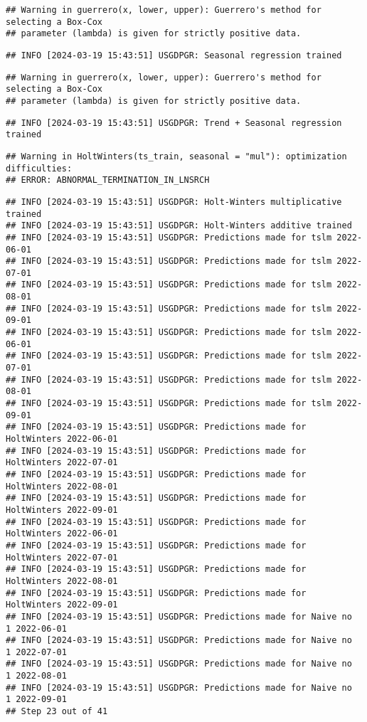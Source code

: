 \documentclass[
]{article}
\begin{document}
\begin{verbatim}
## Warning in guerrero(x, lower, upper): Guerrero's method for selecting a Box-Cox
## parameter (lambda) is given for strictly positive data.
\end{verbatim}

\begin{verbatim}
## INFO [2024-03-19 15:43:51] USGDPGR: Seasonal regression trained
\end{verbatim}

\begin{verbatim}
## Warning in guerrero(x, lower, upper): Guerrero's method for selecting a Box-Cox
## parameter (lambda) is given for strictly positive data.
\end{verbatim}

\begin{verbatim}
## INFO [2024-03-19 15:43:51] USGDPGR: Trend + Seasonal regression trained
\end{verbatim}

\begin{verbatim}
## Warning in HoltWinters(ts_train, seasonal = "mul"): optimization difficulties:
## ERROR: ABNORMAL_TERMINATION_IN_LNSRCH
\end{verbatim}

\begin{verbatim}
## INFO [2024-03-19 15:43:51] USGDPGR: Holt-Winters multiplicative trained
## INFO [2024-03-19 15:43:51] USGDPGR: Holt-Winters additive trained
## INFO [2024-03-19 15:43:51] USGDPGR: Predictions made for tslm 2022-06-01
## INFO [2024-03-19 15:43:51] USGDPGR: Predictions made for tslm 2022-07-01
## INFO [2024-03-19 15:43:51] USGDPGR: Predictions made for tslm 2022-08-01
## INFO [2024-03-19 15:43:51] USGDPGR: Predictions made for tslm 2022-09-01
## INFO [2024-03-19 15:43:51] USGDPGR: Predictions made for tslm 2022-06-01
## INFO [2024-03-19 15:43:51] USGDPGR: Predictions made for tslm 2022-07-01
## INFO [2024-03-19 15:43:51] USGDPGR: Predictions made for tslm 2022-08-01
## INFO [2024-03-19 15:43:51] USGDPGR: Predictions made for tslm 2022-09-01
## INFO [2024-03-19 15:43:51] USGDPGR: Predictions made for HoltWinters 2022-06-01
## INFO [2024-03-19 15:43:51] USGDPGR: Predictions made for HoltWinters 2022-07-01
## INFO [2024-03-19 15:43:51] USGDPGR: Predictions made for HoltWinters 2022-08-01
## INFO [2024-03-19 15:43:51] USGDPGR: Predictions made for HoltWinters 2022-09-01
## INFO [2024-03-19 15:43:51] USGDPGR: Predictions made for HoltWinters 2022-06-01
## INFO [2024-03-19 15:43:51] USGDPGR: Predictions made for HoltWinters 2022-07-01
## INFO [2024-03-19 15:43:51] USGDPGR: Predictions made for HoltWinters 2022-08-01
## INFO [2024-03-19 15:43:51] USGDPGR: Predictions made for HoltWinters 2022-09-01
## INFO [2024-03-19 15:43:51] USGDPGR: Predictions made for Naive no  1 2022-06-01
## INFO [2024-03-19 15:43:51] USGDPGR: Predictions made for Naive no  1 2022-07-01
## INFO [2024-03-19 15:43:51] USGDPGR: Predictions made for Naive no  1 2022-08-01
## INFO [2024-03-19 15:43:51] USGDPGR: Predictions made for Naive no  1 2022-09-01
## Step 23 out of 41
\end{verbatim}
\end{document}
